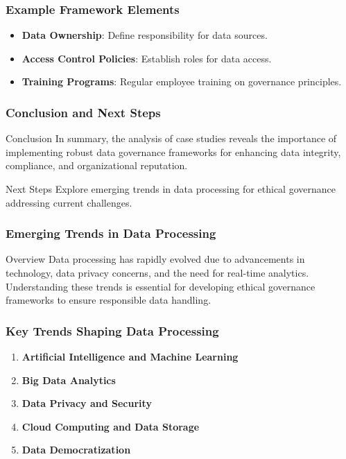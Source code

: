 \documentclass[aspectratio=169]{beamer}
\begin{document}
\begin{frame}[fragile]
    \frametitle{Example Framework Elements}
    \begin{itemize}
        \item \textbf{Data Ownership}: Define responsibility for data sources.
        \item \textbf{Access Control Policies}: Establish roles for data access.
        \item \textbf{Training Programs}: Regular employee training on governance principles.
    \end{itemize}
\end{frame}

\begin{frame}[fragile]
    \frametitle{Conclusion and Next Steps}
    \begin{block}{Conclusion}
        In summary, the analysis of case studies reveals the importance of implementing robust data governance frameworks for enhancing data integrity, compliance, and organizational reputation.
    \end{block}
    \begin{block}{Next Steps}
        Explore emerging trends in data processing for ethical governance addressing current challenges.
    \end{block}
\end{frame}

\begin{frame}[fragile]
    \frametitle{Emerging Trends in Data Processing}
    \begin{block}{Overview}
        Data processing has rapidly evolved due to advancements in technology, data privacy concerns, and the need for real-time analytics. Understanding these trends is essential for developing ethical governance frameworks to ensure responsible data handling.
    \end{block}
\end{frame}

\begin{frame}[fragile]
    \frametitle{Key Trends Shaping Data Processing}
    \begin{enumerate}
        \item \textbf{Artificial Intelligence and Machine Learning}
        \item \textbf{Big Data Analytics}
        \item \textbf{Data Privacy and Security}
        \item \textbf{Cloud Computing and Data Storage}
        \item \textbf{Data Democratization}
    \end{enumerate}
\end{frame}
\end{document}
